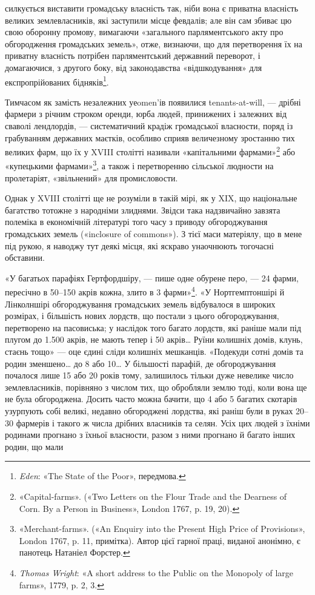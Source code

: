 \parcont{}  %
силкується виставити громадську власність так, ніби вона є
приватна власність великих землевласників, які заступили місце
февдалів; але він сам збиває цю свою оборонну промову, вимагаючи
«загального парляментського акту про обгородження громадських
земель», отже, визнаючи, що для перетворення їх на
приватну власність потрібен парляментський державний переворот,
і домагаючися, з другого боку, від законодавства «відшкодування»
для експропрійованих бідняків\footnote{
\emph{Eden}: «The State of the Poor», передмова.
}.

Тимчасом як замість незалежних уеomen’ів появилися tenants-at-will,
— дрібні фармери з річним строком оренди, юрба
людей, принижених і залежних від сваволі лендлордів, — систематичний
крадіж громадської власности, поряд із грабуванням
державних маєтків, особливо сприяв величезному зростанню
тих великих фарм, що їх у XVIII столітті називали «капітальними
фармами»\footnote{
«Capital-farms». («Two Letters on the Flour Trade and the Dearness
of Corn. By a Person in Business», London 1767, p. 19, 20).
} або «купецькими фармами»\footnote{
«Merchant-farms». («An Enquiry into the Present High Price
of Provisions», London 1767, p. 11, примітка). Автор цієї гарної праці,
виданої анонімно, є панотець Натаніел Форстер.
}, а також і перетворенню
сільської людности на пролетаріят, «звільнений» для
промисловости.

Однак у XVIII столітті ще не розуміли в такій мірі, як у
XIX, що національне багатство тотожне з народніми злиднями.
Звідси така надзвичайно завзята полеміка в економічній літературі
того часу з приводу обгороджування громадських земель
(«inclosure of commons»). З тієї маси матеріялу, що в мене під
рукою, я наводжу тут деякі місця, які яскраво унаочнюють тогочасні
обставини.

«У багатьох парафіях Гертфордшіру, — пише одне обурене
перо, — 24 фарми, пересічно в 50--150 акрів кожна, злито в
3 фарми»\footnote{
\emph{Thomas Wright}: «A short address to the Public on the Monopoly
of large farms», 1779, p. 2, 3.
}. «У Нортгемптоншірі й Лінколншірі обгороджування
громадських земель відбувалося в широких розмірах, і
більшість нових лордств, що постали з цього обгороджування,
перетворено на пасовиська; у наслідок того багато лордств, які
раніше мали під плугом до \num{1.500} акрів, не мають тепер і 50 акрів\dots{}
Руїни колишніх домів, клунь, стаєнь тощо» — оце єдині
сліди колишніх мешканців. «Подекуди сотні домів та родин
зменшено\dots{} до 8 або 10\dots{} У більшості парафій, де обгороджування
почалося лише 15 або 20 років тому, залишилось тільки дуже
невелике число землевласників, порівняно з числом тих, що
обробляли землю тоді, коли вона ще не була обгороджена. Досить
часто можна бачити, що 4 або 5 багатих скотарів узурпують
собі великі, недавно обгороджені лордства, які раніш були в
руках 20--30 фармерів і такого ж числа дрібних власників та
селян. Усіх цих людей з їхніми родинами прогнано з їхньої
власности, разом з ними прогнано й багато інших родин, що мали
\parbreak{}  %
